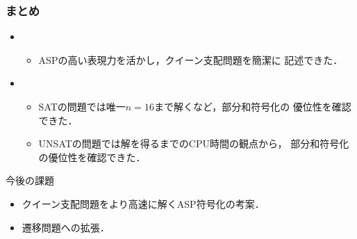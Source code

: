 \documentclass[dvipdfmx,10pt]{beamer}
\begin{document}
\begin{frame}\frametitle{まとめ}
  \begin{itemize}
   \item {}
	 \begin{itemize}
	  \item ASPの高い表現力を活かし，クイーン支配問題を簡潔に
		記述できた．
	 \end{itemize}
   \item {}
	 \begin{itemize}
	  \item SATの問題では唯一$n=16$まで解くなど，部分和符号化の
		優位性を確認できた．
	  \item UNSATの問題では解を得るまでのCPU時間の観点から，
		部分和符号化の優位性を確認できた．
	 \end{itemize}
  \end{itemize}
 \begin{alertblock}{今後の課題}
  \begin{itemize}
   \item クイーン支配問題をより高速に解くASP符号化の考案．
   \item 遷移問題への拡張．
  \end{itemize}
 \end{alertblock}
\end{frame}

%
%


\end{document}
